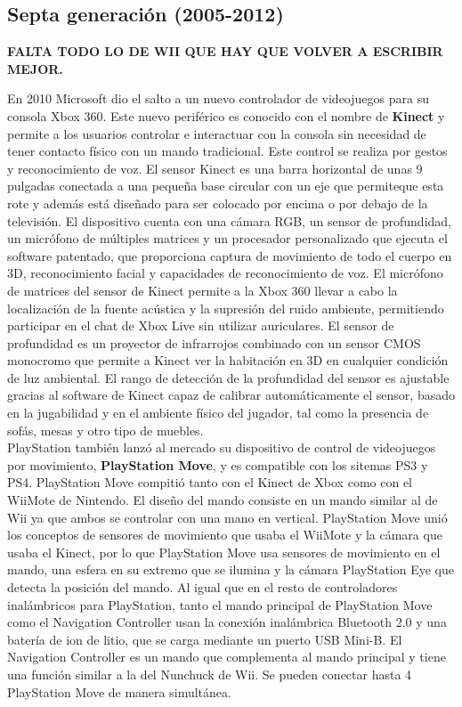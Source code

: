 \subsection{Septa generaci\'on (2005-2012)}


\textbf{FALTA TODO LO DE WII QUE HAY QUE VOLVER A ESCRIBIR MEJOR.}

En 2010 Microsoft dio el salto a un nuevo controlador de videojuegos para su consola Xbox 360. Este nuevo perif\'erico es conocido con el nombre de \textbf{Kinect} y permite a los usuarios controlar e interactuar con la consola sin necesidad de tener contacto f\'isico con un mando tradicional. Este control se realiza por gestos y reconocimiento de voz. El sensor Kinect es una barra horizontal de unas 9 pulgadas conectada a una peque\~na base circular con un eje que permiteque esta rote y adem\'as est\'a dise\~nado para ser colocado por encima o por debajo de la televisi\'on. El dispositivo cuenta con una c\'amara RGB, un sensor de profundidad, un micr\'ofono de m\'ultiples matrices y un procesador personalizado que ejecuta el software patentado, que proporciona captura de movimiento de todo el cuerpo en 3D, reconocimiento facial y capacidades de reconocimiento de voz. El micr\'ofono de matrices del sensor de Kinect permite a la Xbox 360 llevar a cabo la localizaci\'on de la fuente ac\'ustica y la supresi\'on del ruido ambiente, permitiendo participar en el chat de Xbox Live sin utilizar auriculares. El sensor de profundidad es un proyector de infrarrojos combinado con un sensor CMOS monocromo que permite a Kinect ver la habitaci\'on en 3D en cualquier condici\'on de luz ambiental. El rango de detecci\'on de la profundidad del sensor es ajustable gracias al software de Kinect capaz de calibrar autom\'aticamente el sensor, basado en la jugabilidad y en el ambiente f\'isico del jugador, tal como la presencia de sof\'as, mesas y otro tipo de muebles.\\

PlayStation tambi\'en lanz\'o al mercado su dispositivo de control de videojuegos por movimiento, \textbf{PlayStation Move}, y es compatible con los sitemas PS3 y PS4. PlayStation Move compiti\'o tanto con el Kinect de Xbox como con el WiiMote de Nintendo. El dise\~no del mando consiste en un mando similar al de Wii ya que ambos se controlar con una mano en vertical. PlayStation Move uni\'o los conceptos de sensores de movimiento que usaba el WiiMote y la c\'amara que usaba el Kinect, por lo que PlayStation Move usa sensores de movimiento en el mando, una esfera en su extremo que se ilumina y la c\'amara PlayStation Eye que detecta la posici\'on del mando. Al igual que en el resto de controladores inal\'ambricos para PlayStation, tanto el mando principal de PlayStation Move como el Navigation Controller usan la conexi\'on inal\'ambrica Bluetooth 2.0 y una bater\'ia de ion de litio, que se carga mediante un puerto USB Mini-B. El Navigation Controller es un mando que complementa al mando principal y tiene una funci\'on similar a la del Nunchuck de Wii. Se pueden conectar hasta 4 PlayStation Move de manera simult\'anea.\\

